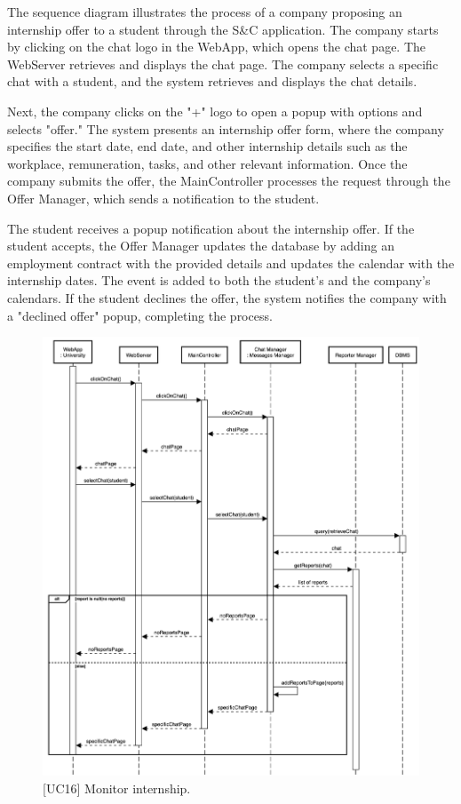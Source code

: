 The sequence diagram illustrates the process of a company proposing an internship offer to a student through the S\&C application. The company starts by clicking on the chat logo in the WebApp, which opens the chat page. The WebServer retrieves and displays the chat page. The company selects a specific chat with a student, and the system retrieves and displays the chat details.

Next, the company clicks on the "+" logo to open a popup with options and selects "offer." The system presents an internship offer form, where the company specifies the start date, end date, and other internship details such as the workplace, remuneration, tasks, and other relevant information. Once the company submits the offer, the MainController processes the request through the Offer Manager, which sends a notification to the student.

The student receives a popup notification about the internship offer. If the student accepts, the Offer Manager updates the database by adding an employment contract with the provided details and updates the calendar with the internship dates. The event is added to both the student’s and the company’s calendars. If the student declines the offer, the system notifies the company with a "declined offer" popup, completing the process.

\begin{figure}[htbp]
    \centering
    \includegraphics[width=\linewidth]{DD/Images/sequenceDiagrams/monitorInternship.png}
    \caption{[UC16] Monitor internship.}
    \label{fig:monitorInternship_immagine}
\end{figure}
\clearpage



